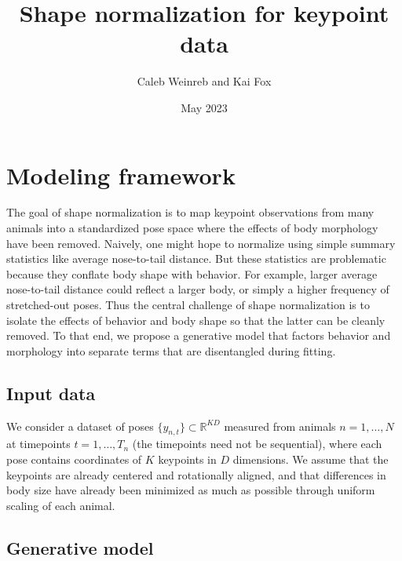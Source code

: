 \documentclass{article}         %
\title{Shape normalization for keypoint data}
\author{Caleb Weinreb and Kai Fox}
\date{May 2023}
\begin{document}
\maketitle

\section{Modeling framework}
\label{sec:model-fwk}

The goal of shape normalization is to map keypoint observations from many animals into a standardized pose space where the effects of body morphology have been removed. Naively, one might hope to normalize using simple summary statistics like average nose-to-tail distance. But these statistics are problematic because they conflate body shape with behavior. For example, larger average nose-to-tail distance could reflect a larger body, or simply a higher frequency of stretched-out poses. Thus the central challenge of shape normalization is to isolate the effects of behavior and body shape so that the latter can be cleanly removed. To that end, we propose a generative model that factors behavior and morphology into separate terms that are disentangled during fitting.

\subsection{Input data}

We consider a dataset of poses $\{y_{n,t}\} \subset \mathbb{R}^{KD}$ measured from animals $n=1,\dots,N$ at timepoints $t=1,\dots,T_n$ (the timepoints need not be sequential), where each pose contains coordinates of $K$ keypoints in $D$ dimensions. We assume that the keypoints are already centered and rotationally aligned, and that differences in body size have already been minimized as much as possible through uniform scaling of each animal. 

\subsection{Generative model}
\label{sec:gen-model}
\end{document}
